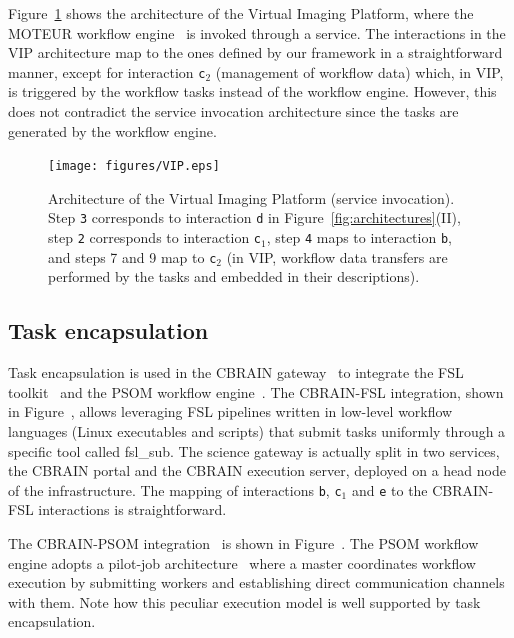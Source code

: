 \documentclass[preprint,3p,twocolumn]{elsarticle}
\begin{document}
{Figure~\ref{fig:vip-architecture} shows the architecture of the
Virtual Imaging Platform, where the MOTEUR workflow
engine~\cite{GLAT-08i} is invoked through a service. The interactions
in the VIP architecture map to the ones defined by our framework in a
straightforward manner, except for interaction \texttt{c$_2$}
(management of workflow data) which, in VIP, is triggered by the
workflow tasks instead of the workflow engine. However, this does not
contradict the service invocation architecture since the tasks are
generated by the workflow engine.
\begin{figure}
\texttt{[image: figures/VIP.eps]}
\caption{Architecture of the Virtual Imaging Platform (service
  invocation).  Step \texttt{3} corresponds to interaction \texttt{d}
  in Figure~\ref{fig:architectures}(II), step \texttt{2} corresponds
  to interaction \texttt{c$_1$}, step \texttt{4} maps to interaction
  \texttt{b}, and steps 7 and 9 map to \texttt{c$_2$} (in VIP,
  workflow data transfers are performed by the tasks and embedded in
  their descriptions).}
\label{fig:vip-architecture}
\end{figure}

\subsection{Task encapsulation}

Task encapsulation is used in the CBRAIN gateway~\cite{SHER-14} to
integrate the FSL toolkit~\cite{Jenkinson2012782} and the PSOM
workflow engine~\cite{bellec2012pipeline}. The CBRAIN-FSL integration,
shown in Figure~, allows
leveraging FSL pipelines written in low-level workflow languages
(Linux executables and scripts) that submit tasks uniformly through a
specific tool called fsl\_sub. The science gateway is actually split
in two services, the CBRAIN portal and the CBRAIN execution server,
deployed on a head node of the infrastructure. The mapping of
interactions \texttt{b}, \texttt{c$_1$} and \texttt{e} to the
CBRAIN-FSL interactions is straightforward.

The CBRAIN-PSOM integration~\cite{GLAT-16} is shown in
Figure~. The PSOM workflow engine
adopts a pilot-job architecture~\cite{turilli2015comprehensive} where
a master coordinates workflow execution by submitting workers and
establishing direct communication channels with them. Note how this
peculiar execution model is well supported by task encapsulation.

}
\end{document}
